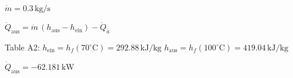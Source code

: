 \(\dot{m} = 0.3 \, \text{kg/s}\)  

\(\dot{Q}_{\text{aus}} = \dot{m} \, (h_{\text{aus}} - h_{\text{ein}}) - \dot{Q}_a\)  

Table A2:  
\(h_{\text{ein}} = h_f(70^\circ \text{C}) = 292.88 \, \text{kJ/kg}\)  
\(h_{\text{aus}} = h_f(100^\circ \text{C}) = 419.04 \, \text{kJ/kg}\)  

\(\dot{Q}_{\text{aus}} = -62.181 \, \text{kW}\)